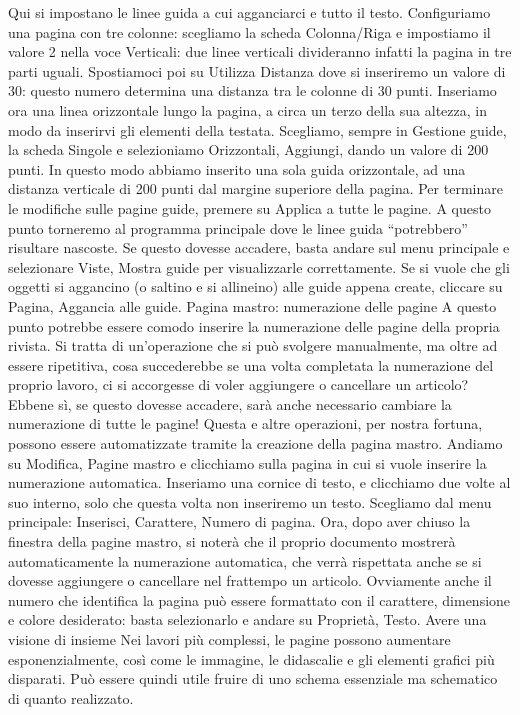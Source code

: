 \documentclass[a4paper, 12pt]{book}
\begin{document}
Qui si impostano le linee guida a cui agganciarci e tutto il testo. Configuriamo una pagina con tre colonne: scegliamo la scheda Colonna/Riga e impostiamo il valore 2 nella voce Verticali: due linee verticali divideranno infatti la pagina in tre parti uguali. Spostiamoci poi su Utilizza Distanza dove si inseriremo un valore di 30: questo numero determina una distanza tra le colonne di 30 punti.
Inseriamo ora una linea orizzontale lungo la pagina, a circa un terzo della sua altezza, in modo da inserirvi gli elementi della testata. Scegliamo, sempre in Gestione guide, la scheda Singole e selezioniamo Orizzontali, Aggiungi, dando un valore di 200 punti. In questo modo abbiamo inserito una sola guida orizzontale, ad una distanza verticale di 200 punti dal margine superiore della pagina. Per terminare le modifiche sulle pagine guide, premere su Applica a tutte le pagine. 
A questo punto torneremo al programma principale dove le linee guida “potrebbero” risultare nascoste. Se questo dovesse accadere, basta andare sul menu principale e selezionare Viste, Mostra guide per visualizzarle correttamente.
Se si vuole che gli oggetti si aggancino (o saltino e si allineino) alle guide appena create, cliccare su Pagina, Aggancia alle guide.
Pagina mastro: numerazione delle pagine
A questo punto potrebbe essere comodo inserire la numerazione delle pagine della propria rivista. Si tratta di un'operazione che si può svolgere manualmente, ma oltre ad essere ripetitiva, cosa succederebbe se una volta completata la numerazione del proprio lavoro, ci si accorgesse di voler aggiungere o cancellare un articolo? Ebbene sì, se questo dovesse accadere, sarà anche necessario cambiare la numerazione di tutte le pagine! Questa e altre operazioni, per nostra fortuna, possono essere automatizzate tramite la creazione della pagina mastro.
Andiamo su Modifica, Pagine mastro e clicchiamo sulla pagina in cui si vuole inserire la numerazione automatica. Inseriamo una cornice di testo, e clicchiamo due volte al suo interno, solo che questa volta non inseriremo un testo. 
Scegliamo dal menu principale: Inserisci, Carattere, Numero di pagina. Ora, dopo aver chiuso la finestra della pagine mastro, si noterà che il proprio documento mostrerà automaticamente la numerazione automatica, che verrà rispettata anche se si dovesse aggiungere o cancellare nel frattempo un articolo. Ovviamente anche il numero che identifica la pagina può essere formattato con il carattere, dimensione e colore desiderato: basta selezionarlo e andare su Proprietà, Testo.
Avere una visione di insieme
Nei lavori più complessi, le pagine possono aumentare esponenzialmente, così come le immagine, le didascalie e gli elementi grafici più disparati. Può essere quindi utile fruire di uno schema essenziale ma schematico di quanto realizzato.
\end{document}
